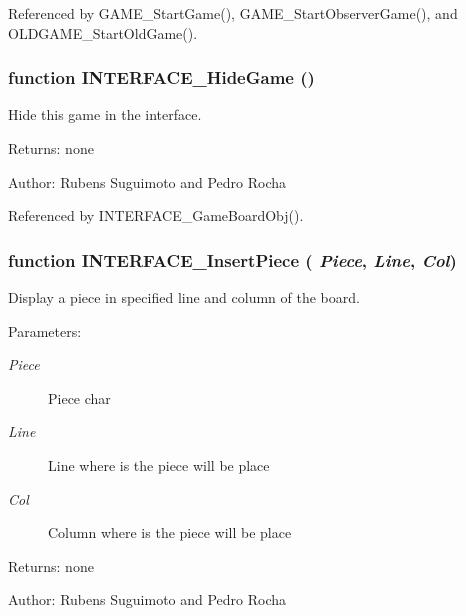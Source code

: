 Referenced by GAME\_\-StartGame(), GAME\_\-StartObserverGame(), and OLDGAME\_\-StartOldGame().
\subsubsection[INTERFACE\_\-HideGame]{\setlength{\rightskip}{0pt plus 5cm}function INTERFACE\_\-HideGame ()}\label{interface_2game_8js_a6c712507992971eb1e13566da78e64a}


Hide this game in the interface. 

\begin{Desc}
\item[Returns:]none \end{Desc}
\begin{Desc}
\item[Author:]Rubens Suguimoto and Pedro Rocha \end{Desc}


Referenced by INTERFACE\_\-GameBoardObj().
\subsubsection[INTERFACE\_\-InsertPiece]{\setlength{\rightskip}{0pt plus 5cm}function INTERFACE\_\-InsertPiece ( {\em Piece}, \/   {\em Line}, \/   {\em Col})}\label{interface_2game_8js_5da00627eeeb1f747bd96aae92ff412e}


Display a piece in specified line and column of the board. 

\begin{Desc}
\item[Parameters:]
\begin{description}
\item[{\em Piece}]Piece char \item[{\em Line}]Line where is the piece will be place \item[{\em Col}]Column where is the piece will be place \end{description}
\end{Desc}
\begin{Desc}
\item[Returns:]none \end{Desc}
\begin{Desc}
\item[Author:]Rubens Suguimoto and Pedro Rocha \end{Desc}


